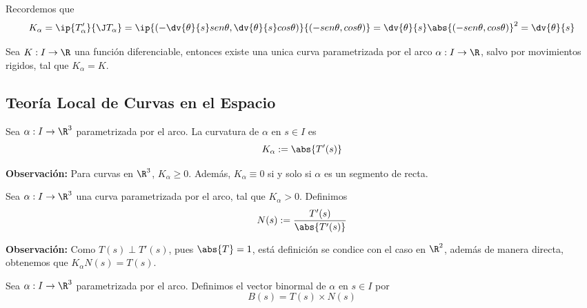 \documentclass{article}
\begin{document}
\begin{dem}
    Recordemos que
    \begin{equation*}
        K_{\alpha}=\ip{T'_{\alpha}}{\J T_{\alpha}}=
        \ip{\left(-\dv{\theta}{s}sen\theta,\dv{\theta}{s}cos\theta\right)}
        {(-sen\theta,cos\theta)}=\dv{\theta}{s}\abs{(-sen\theta,cos\theta)}^{2}=\dv{\theta}{s}
    \end{equation*}
\end{dem}

\begin{teo}
    Sea $K: I\to\R$ una función diferenciable, entonces existe una unica curva parametrizada por 
    el arco $\alpha: I\to\R$, salvo por movimientos rigidos, tal que $K_{\alpha}=K$.
\end{teo}

\subsection{Teoría Local de Curvas en el Espacio}

\begin{dfn}
    Sea $\alpha: I\to\R^{3}$ parametrizada por el arco. La curvatura de $\alpha$ en $s\in I$ es
    \begin{equation*}
        K_{\alpha}:=\abs{T'(s)}
    \end{equation*}
\end{dfn}

\noindent\textbf{Observación:} Para curvas en $\R^{3}$, $K_{\alpha}\geq0$. Además, 
$K_{\alpha}\equiv0$ si y solo si $\alpha$ es un segmento de recta.

\begin{dfn}
    Sea $\alpha: I\to\R^{3}$ una curva parametrizada por el arco, tal que $K_{\alpha}>0$. Definimos
    \begin{equation*}
        N(s):=\frac{T'(s)}{\abs{T'(s)}}
    \end{equation*}
\end{dfn}

\noindent\textbf{Observación:} Como $T(s)\perp T'(s)$, pues $\abs{T}=1$, está definición se condice
con el caso en $\R^{2}$, además de manera directa, obtenemos que $K_{\alpha}N(s)=T(s)$.

\begin{dfn}
    Sea $\alpha: I\to\R^{3}$ parametrizada por el arco. Definimos el vector binormal de $\alpha$
    en $s\in I$ por
    \begin{equation*}
        B(s)=T(s)\times N(s)
    \end{equation*}
\end{dfn}
\end{document}

